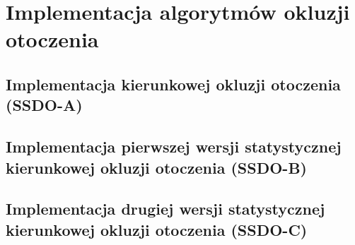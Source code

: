 \chapter{Implementacja algorytmów okluzji otoczenia}
\label{t:impl}

	\section{Implementacja kierunkowej okluzji otoczenia (SSDO-A)}
	\label{t:impl:a}
	
	\section{Implementacja pierwszej wersji statystycznej kierunkowej okluzji otoczenia (SSDO-B)}
	\label{t:impl:b}
	
	\section{Implementacja drugiej wersji statystycznej kierunkowej okluzji otoczenia (SSDO-C)}
	\label{t:impl:c}
